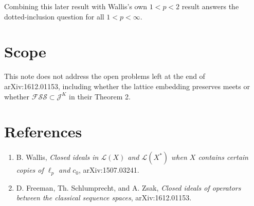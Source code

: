 \documentclass[11pt]{article}
\begin{document}
Combining this later result with Wallis's own $1<p<2$ result answers the
dotted-inclusion question for all $1<p<\infty$.

\section*{Scope}

This note does not address the open problems left at the end of
arXiv:1612.01153, including whether the lattice embedding preserves meets or
whether $\mathcal{FSS}\subset \mathcal J^K$ in their Theorem 2.

\section*{References}

\begin{enumerate}
\item B. Wallis, \emph{Closed ideals in $\mathcal{L}(X)$ and
$\mathcal{L}(X^*)$ when $X$ contains certain copies of $\ell_p$ and $c_0$},
arXiv:1507.03241.
\item D. Freeman, Th. Schlumprecht, and A. Zsak,
\emph{Closed ideals of operators between the classical sequence spaces},
arXiv:1612.01153.
\end{enumerate}
\end{document}
